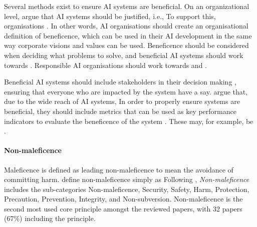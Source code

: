 Several methods exist to ensure AI systems are beneficial. On an organizational level, \textcite[p.~2151]{Morley_2020} argue that AI systems should be justified, i.e.,  To support this, organisations  \parencite[p.~9]{vanBruxvoort_2021}. In other words, AI organisations should create an organisational definition of beneficence, which can be used in their AI development in the same way corporate visions and values can be used. Beneficence should be considered when deciding what problems to solve, and beneficial AI systems should work towards  \parencite[p.~73]{Ryan_2021}. Responsible AI organisations should work towards   and  \parencite[p.~11]{Jobin_2019}.

Beneficial AI systems should include stakeholders in their decision making \parencite{Lu_2022,Havrda_2020,Morley_2020}, ensuring that everyone who are impacted by the system have a say. \textcite[p.~134]{Nevanperä_2021} argue that, due to the wide reach of AI systems,  In order to properly ensure systems are beneficial, they should include metrics that can be used as key performance indicators to evaluate the beneficence of the system \parencite{Eitel-Porter_2021}. These may, for example, be  \parencite[p.~5]{Havrda_2020}.


\paragraph{Non-maleficence}
Maleficence is defined as  leading non-maleficence to mean the avoidance of committing harm. \textcite[p.~697]{Floridi_2018} define non-maleficence simply as  Following \textcite{Ryan_2021}, \textit{Non-maleficence} includes the sub-categories Non-maleficence, Security, Safety, Harm, Protection, Precaution, Prevention, Integrity, and Non-subversion. Non-maleficence is the second most used core principle amongst the reviewed papers, with 32 papers (67\%) including the principle.

